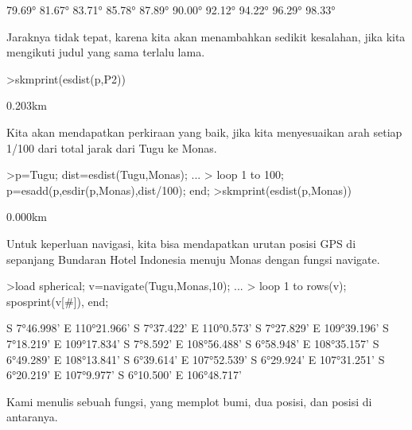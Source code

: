 \documentclass[a4paper,10pt]{article}
\begin{document}
\begin{eulernotebook}
\begin{eulercomment}
\begin{eulercomment}
\begin{eulercomment}
\begin{eulercomment}
\begin{eulerprompt}
\end{eulerprompt}
\begin{euleroutput}
       79.69°
       81.67°
       83.71°
       85.78°
       87.89°
       90.00°
       92.12°
       94.22°
       96.29°
       98.33°
\end{euleroutput}
\begin{eulercomment}
Jaraknya tidak tepat, karena kita akan menambahkan sedikit kesalahan,
jika kita mengikuti judul yang sama terlalu lama.
\end{eulercomment}
\begin{eulerprompt}
>skmprint(esdist(p,P2))
\end{eulerprompt}
\begin{euleroutput}
       0.203km
\end{euleroutput}
\begin{eulercomment}
Kita akan mendapatkan perkiraan yang baik, jika kita menyesuaikan arah
setiap 1/100 dari total jarak dari Tugu ke Monas.
\end{eulercomment}
\begin{eulerprompt}
>p=Tugu; dist=esdist(Tugu,Monas); ...
>  loop 1 to 100; p=esadd(p,esdir(p,Monas),dist/100); end;
>skmprint(esdist(p,Monas))
\end{eulerprompt}
\begin{euleroutput}
       0.000km
\end{euleroutput}
\begin{eulercomment}
Untuk keperluan navigasi, kita bisa mendapatkan urutan posisi GPS di
sepanjang Bundaran Hotel Indonesia menuju Monas dengan fungsi
navigate.
\end{eulercomment}
\begin{eulerprompt}
>load spherical; v=navigate(Tugu,Monas,10); ...
>  loop 1 to rows(v); sposprint(v[#]), end;
\end{eulerprompt}
\begin{euleroutput}
  S 7°46.998' E 110°21.966'
  S 7°37.422' E 110°0.573'
  S 7°27.829' E 109°39.196'
  S 7°18.219' E 109°17.834'
  S 7°8.592' E 108°56.488'
  S 6°58.948' E 108°35.157'
  S 6°49.289' E 108°13.841'
  S 6°39.614' E 107°52.539'
  S 6°29.924' E 107°31.251'
  S 6°20.219' E 107°9.977'
  S 6°10.500' E 106°48.717'
\end{euleroutput}
\begin{eulercomment}
Kami menulis sebuah fungsi, yang memplot bumi, dua posisi, dan posisi
di antaranya.
\end{eulercomment}
\begin{eulerprompt}

\end{eulerprompt}
\end{eulercomment}
\end{eulercomment}
\end{eulercomment}
\end{eulercomment}
\end{eulernotebook}
\end{document}
